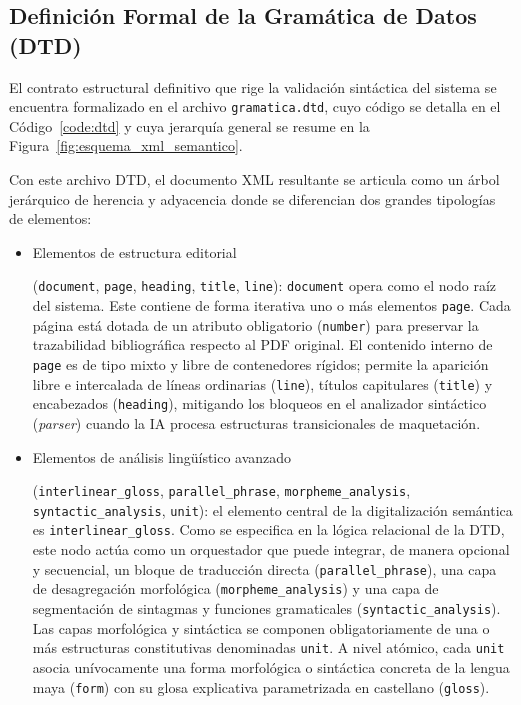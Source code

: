 \subsection{Definición Formal de la Gramática de Datos (DTD)}

El contrato estructural definitivo que rige la validación sintáctica del sistema se encuentra formalizado en el archivo \texttt{gramatica.dtd}, cuyo código se detalla en el Código~\ref{code:dtd} y cuya jerarquía general se resume en la Figura~\ref{fig:esquema_xml_semantico}.

Con este archivo DTD, el documento XML resultante se articula como un árbol jerárquico de herencia y adyacencia donde se diferencian dos grandes tipologías de elementos:

\begin{itemize}
    \item Elementos de estructura editorial 
    
    (\texttt{document}, \texttt{page}, \texttt{heading}, \texttt{title}, \texttt{line}): \texttt{document} opera como el nodo raíz del sistema. Este contiene de forma iterativa uno o más elementos \texttt{page}. Cada página está dotada de un atributo obligatorio (\texttt{number}) para preservar la trazabilidad bibliográfica respecto al PDF original. El contenido interno de \texttt{page} es de tipo mixto y libre de contenedores rígidos; permite la aparición libre e intercalada de líneas ordinarias (\texttt{line}), títulos capitulares (\texttt{title}) y encabezados (\texttt{heading}), mitigando los bloqueos en el analizador sintáctico (\textit{parser}) cuando la IA procesa estructuras transicionales de maquetación.

    \item Elementos de análisis lingüístico avanzado 
    
    (\texttt{interlinear\_gloss}, \texttt{parallel\_phrase}, \texttt{morpheme\_analysis}, \texttt{syntactic\_analysis}, \texttt{unit}): el elemento central de la digitalización semántica es \texttt{interlinear\_gloss}. Como se especifica en la lógica relacional de la DTD, este nodo actúa como un orquestador que puede integrar, de manera opcional y secuencial, un bloque de traducción directa (\texttt{parallel\_phrase}), una capa de desagregación morfológica (\texttt{morpheme\_analysis}) y una capa de segmentación de sintagmas y funciones gramaticales (\texttt{syntactic\_analysis}). Las capas morfológica y sintáctica se componen obligatoriamente de una o más estructuras constitutivas denominadas \texttt{unit}. A nivel atómico, cada \texttt{unit} asocia unívocamente una forma morfológica o sintáctica concreta de la lengua maya (\texttt{form}) con su glosa explicativa parametrizada en castellano (\texttt{gloss}).
\end{itemize}

